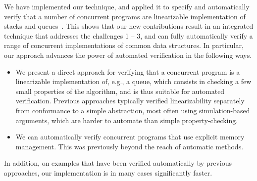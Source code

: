 We have implemented our technique, and
applied it to
specify and automatically
verify that a number of concurrent programs are linearizable
implementation of stacks and queues~\cite{HeWi:linearizability}.
This shows that our new contributions result in an integrated
technique that addresses the challenges 1 -- 3,
and can fully automatically verify a range of 
concurrent implementations of common data structures.
In particular, our approach advances the power of automated verification in
the following ways.
%
\begin{itemize}
\item
We present a direct approach for verifying that a concurrent program is a linearizable implementation of, e.g., a queue, which consists in checking a few
small properties of the algorithm, and is thus
suitable for automated verification.
Previous approaches typically verified linearizability separately from
conformance to a simple abstraction, most often
using simulation-based arguments, which are harder
to automate than simple property-checking.
\item
We can automatically verify concurrent programs that use
explicit memory management. This was previously beyond
the reach of automatic methods.
\end{itemize}
%
In addition, on examples that have been verified automatically by
previous approaches, our implementation is in many cases significantly faster.

